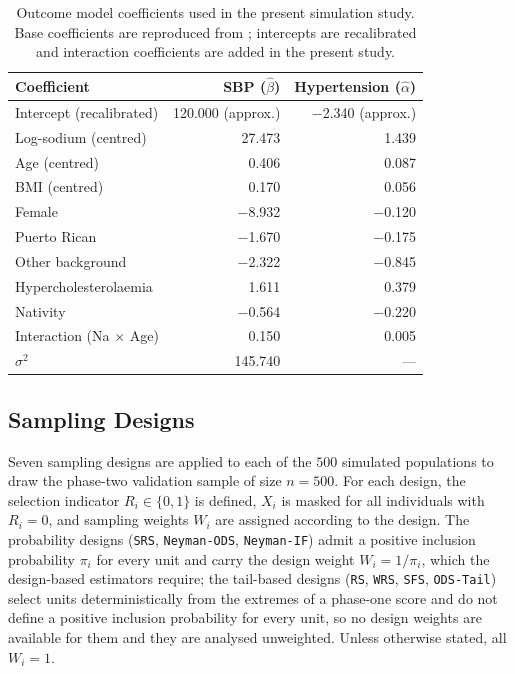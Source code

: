 \begin{table}[ht]
\centering
\caption{Outcome model coefficients used in the present simulation study. Base coefficients are reproduced from \citet{baldoni2021use}; intercepts are recalibrated and interaction coefficients are added in the present study.}
\label{tab:app_outcome_coef}
\begin{tabular}{lrr}
\hline
Coefficient & SBP ($\hat{\beta}$) & Hypertension ($\hat{\alpha}$) \\
\hline
Intercept (recalibrated) & 120.000 (approx.) & $-$2.340 (approx.) \\
Log-sodium (centred) & 27.473 & 1.439 \\
Age (centred) & 0.406 & 0.087 \\
BMI (centred) & 0.170 & 0.056 \\
Female & $-$8.932 & $-$0.120 \\
Puerto Rican & $-$1.670 & $-$0.175 \\
Other background & $-$2.322 & $-$0.845 \\
Hypercholesterolaemia & 1.611 & 0.379 \\
Nativity & $-$0.564 & $-$0.220 \\
Interaction (Na $\times$ Age) & 0.150 & 0.005 \\
$\sigma^2$ & 145.740 & --- \\
\hline
\end{tabular}
\end{table}

\subsection{Sampling Designs}
\label{app:sim1_sampling}

Seven sampling designs are applied to each of the $500$ simulated populations to draw the phase-two validation sample of size $n = 500$. For each design, the selection indicator $R_i \in \{0,1\}$ is defined, $X_i$ is masked for all individuals with $R_i = 0$, and sampling weights $W_i$ are assigned according to the design. The probability designs (\texttt{SRS}, \texttt{Neyman-ODS}, \texttt{Neyman-IF}) admit a positive inclusion probability $\pi_i$ for every unit and carry the design weight $W_i = 1/\pi_i$, which the design-based estimators require; the tail-based designs (\texttt{RS}, \texttt{WRS}, \texttt{SFS}, \texttt{ODS-Tail}) select units deterministically from the extremes of a phase-one score and do not define a positive inclusion probability for every unit, so no design weights are available for them and they are analysed unweighted. Unless otherwise stated, all $W_i = 1$.

